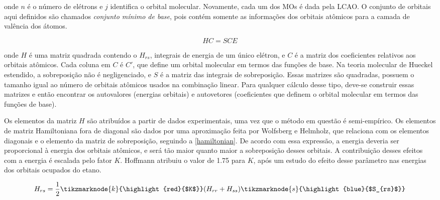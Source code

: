 \noindent onde $n$ é o número de elétrons e $j$ identifica o orbital molecular. Novamente, cada um dos \gls{MOs} é dada pela LCAO. O conjunto de orbitais aqui definidos são chamados \textit{conjunto mínimo de base}, pois contém somente as informações dos orbitais atômicos para a camada de valência dos átomos. 

\begin{equation}
    HC = SCE
\end{equation}

\noindent onde $H$ é uma matriz quadrada contendo o $H_{rs}$, integrais de energia de um único elétron, e $C$ é a matriz dos coeficientes relativos aos orbitais atômicos. Cada coluna em $C$ é $C'$, que define um orbital molecular em termos das funções de base. Na teoria molecular de Hueckel estendido, a sobreposição não é negligenciado, e $S$ é a matriz das integrais de sobreposição. Essas matrizes são quadradas, possuem o tamanho igual ao número de orbitais atômicos usados na combinação linear. Para qualquer cálculo desse tipo, deve-se construir essas matrizes e então encontrar os autovalores (energias orbitais) e autovetores (coeficientes que definem o orbital molecular em termos das funções de base).

Os elementos da matriz $H$ são atribuídos a partir de dados experimentais, uma vez que o método em questão é semi-empírico. Os elementos de matriz Hamiltoniana fora de diagonal são dados por uma aproximação feita por Wolfsberg e Helmholz, que relaciona com os elementos diagonais e o elemento da matriz de sobreposição, seguindo a \autoref{hamiltonian}. De acordo com essa expressão, a energia deveria ser proporcional à energia dos orbitais atômicos, e será tão maior quanto maior a sobreposição desses orbitais. A contribuição desses efeitos com a energia é escalada pelo fator $K$. Hoffmann \autocite{Hoffmann1963} atribuiu o valor de 1.75 para $K$, após um estudo do efeito desse parâmetro nas energias dos orbitais ocupados do etano.

\begin{figure}[htb]
\label{hamiltonian}
    \vspace{2\baselineskip}
\begin{equation}
    H_{rs} = \frac{1}{2} \tikzmarknode{k}{\highlight{red}{$K$}}(H_{rr} + H_{ss}) \tikzmarknode{s}{\highlight{blue}{$S_{rs}$}}
\end{equation}
\end{figure}


